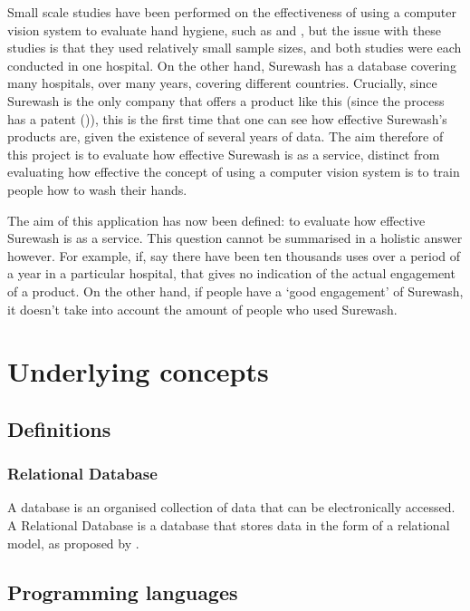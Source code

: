 Small scale studies have been performed on the effectiveness of using a computer vision system to evaluate hand hygiene, such as \cite{ghosh2011impact} and \cite{ghosh2013pilot}, but the issue with these studies is that they used relatively small sample sizes, and both studies were each conducted in one hospital. On the other hand, Surewash has a database covering many hospitals, over many years, covering different countries. Crucially, since Surewash is the only company that offers a product like this (since the process has a patent (\cite{handwashpatentglanta})), this is the first time that one can see how effective Surewash's products are, given the existence of several years of data. The aim therefore of this project is to evaluate how effective Surewash is as a service, distinct from evaluating how effective the concept of using a computer vision system is to train people how to wash their hands.

The aim of this application has now been defined: to evaluate how effective Surewash is as a service. This question cannot be summarised in a holistic answer however. For example, if, say there have been ten thousands uses over a period of a year in a particular hospital, that gives no indication of the actual engagement of a product. On the other hand, if people have a `good engagement' of Surewash, it doesn't take into account the amount of people who used Surewash.


\section{Underlying concepts}
    \subsection{Definitions}
        \subsubsection{Relational Database}
        A database is an organised collection of data that can be electronically accessed. A Relational Database is a database that stores data in the form of a relational model, as proposed by \cite{Codd}.
    \subsection{Programming languages}
